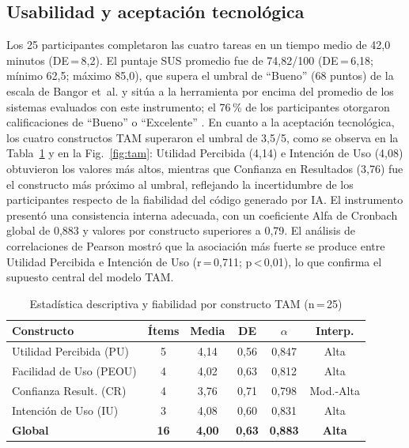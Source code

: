 \documentclass[10pt,journal,twoside,letterpaper]{IEEEtran}
\begin{document}
	\subsection{Usabilidad y aceptación tecnológica}
	\label{subsec:sustam}
	
	Los 25 participantes completaron las cuatro tareas en un tiempo medio de 42,0 minutos (DE\,=\,8,2). El puntaje SUS promedio fue de 74,82/100 (DE\,=\,6,18; mínimo 62,5; máximo 85,0), que supera el umbral de ``Bueno'' (68 puntos) de la escala de Bangor et~al. y sitúa a la herramienta por encima del promedio de los sistemas evaluados con este instrumento; el 76\,\% de los participantes otorgaron calificaciones de ``Bueno'' o ``Excelente'' \cite{bangor2009sus}. En cuanto a la aceptación tecnológica, los cuatro constructos TAM superaron el umbral de 3,5/5, como se observa en la Tabla~\ref{tab:tam} y en la Fig.~\ref{fig:tam}: Utilidad Percibida (4,14) e Intención de Uso (4,08) obtuvieron los valores más altos, mientras que Confianza en Resultados (3,76) fue el constructo más próximo al umbral, reflejando la incertidumbre de los participantes respecto de la fiabilidad del código generado por IA. El instrumento presentó una consistencia interna adecuada, con un coeficiente Alfa de Cronbach global de 0,883 y valores por constructo superiores a 0,79. El análisis de correlaciones de Pearson mostró que la asociación más fuerte se produce entre Utilidad Percibida e Intención de Uso (r\,=\,0,711; p\,<\,0,01), lo que confirma el supuesto central del modelo TAM.
	
	\begin{table}[!t]
		\caption{Estadística descriptiva y fiabilidad por constructo TAM (n\,=\,25)}
		\label{tab:tam}
		\centering
		\small
		\setlength{\tabcolsep}{3pt}
		\begin{tabular}{@{}lccccc@{}}
			\toprule
			\textbf{Constructo} & \textbf{Ítems} & \textbf{Media} & \textbf{DE} & \textbf{$\alpha$} & \textbf{Interp.} \\
			\midrule
			Utilidad Percibida (PU)   & 5 & 4,14 & 0,56 & 0,847 & Alta \\
			Facilidad de Uso (PEOU)   & 4 & 4,02 & 0,63 & 0,812 & Alta \\
			Confianza Result. (CR)    & 4 & 3,76 & 0,71 & 0,798 & Mod.-Alta \\
			Intención de Uso (IU)     & 3 & 4,08 & 0,60 & 0,831 & Alta \\
			\midrule
			\textbf{Global}           & \textbf{16} & \textbf{4,00} & \textbf{0,63} & \textbf{0,883} & \textbf{Alta} \\
			\bottomrule
		\end{tabular}
	\end{table}
	
\end{document}
